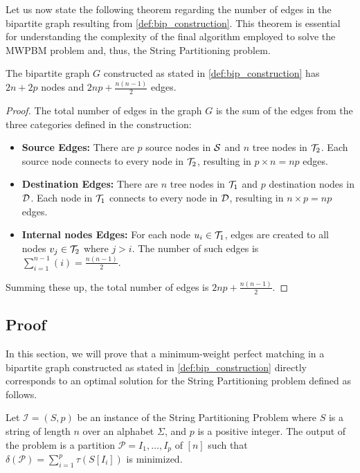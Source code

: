 Let us now state the following theorem regarding the number of edges in the bipartite graph resulting from \cref{def:bip_construction}. This theorem is essential for understanding the complexity of the final algorithm employed to solve the MWPBM problem and, thus, the String Partitioning problem.

\begin{theorem} \label{thm:bip_graph_properties}
    The bipartite graph $G$ constructed as stated in \cref{def:bip_construction} has $2n + 2p$ nodes and $2np + \frac{n(n-1)}{2}$ edges.
\end{theorem}

\begin{proof}
    The total number of edges in the graph $G$ is the sum of the edges from the three categories defined in the construction:
    \begin{itemize}[leftmargin=25pt]
        \item \textbf{Source Edges:} There are $p$ source nodes in $\mathcal{S}$ and $n$ tree nodes in $\mathcal{T}_{2}$. Each source node connects to every node in $\mathcal{T}_{2}$, resulting in $p \times n = np$ edges.

        \item \textbf{Destination Edges:} There are $n$ tree nodes in $\mathcal{T}_{1}$ and $p$ destination nodes in $\mathcal{D}$. Each node in $\mathcal{T}_{1}$ connects to every node in $\mathcal{D}$, resulting in $n \times p = np$ edges.

        \item \textbf{Internal nodes Edges:} For each node $u_i \in \mathcal{T}_{1}$, edges are created to all nodes $v_j \in \mathcal{T}_{2}$ where $j > i$. The number of such edges is $\sum_{i=1}^{n-1} (i) = \frac{n(n-1)}{2}$.
    \end{itemize}

    Summing these up, the total number of edges is $2np + \frac{n(n-1)}{2}$.
\end{proof}

\subsection{Proof}
In this section, we will prove that a minimum-weight perfect matching in a bipartite graph constructed as stated in \cref{def:bip_construction} directly corresponds to an optimal solution for the String Partitioning problem defined as follows.

\begin{definition}
    Let $\mathcal{I} = (S, p)$ be an instance of the String Partitioning Problem where $S$ is a string of length $n$ over an alphabet $\Sigma$, and $p$ is a positive integer. The output of the problem is a partition $\mathcal{P}=I_1,\dots,I_p$ of $[n]$ such that $\delta(\mathcal{P}) = \sum_{i=1}^p \tau(S[I_i])$ is minimized.
\end{definition}

